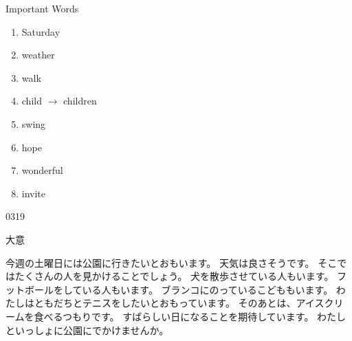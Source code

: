 \documentclass[aspectratio=169,xcolor={dvipsnames,table}]{beamer}
\begin{document}
\begin{frame}[plain]{Important Words}
 \large
\begin{enumerate}
 \item Saturday \hfill{}
 \item weather \hfill{}
 \item walk \hfill{}
 \item child  $\longrightarrow$ children \hfill{}
 \item swing \hfill{}
 \item hope \hfill{}
 \item wonderful \hfill{}
 \item invite \hfill{}
\end{enumerate}
\hfill{\tiny 0319}\,{\scriptsize {}}

\end{frame}
\begin{frame}[plain]{大意}
 
\begin{tcolorbox}[title=公園での一日,
before upper={\setlength{\parindent}{1\zw}}
]
今週の土曜日には公園に行きたいとおもいます。
天気は良さそうです。
そこではたくさんの人を見かけることでしょう。
犬を散歩させている人もいます。
フットボールをしている人もいます。
ブランコにのっているこどももいます。
わたしはともだちとテニスをしたいとおもっています。
そのあとは、アイスクリームを食べるつもりです。
すばらしい日になることを期待しています。
わたしといっしょに公園にでかけませんか。
\end{tcolorbox}
\end{frame}
\end{document}
